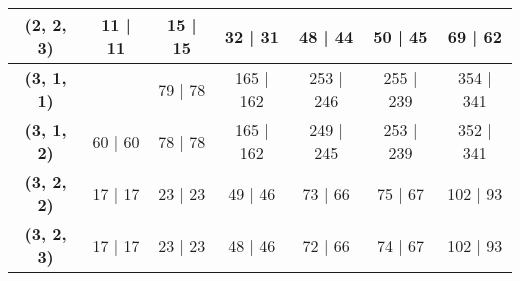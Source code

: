\documentclass[12pt]{article}
\begin{document}
\begin{table}[H]
\begin{tabular}{|c|c|c|c|c|c|c|}
  \textbf{(2, 2, 3)}            & 11 | 11                                                & \cellcolor[HTML]{F8A102}15 | 15 & 32 | 31                           & \cellcolor[HTML]{F8A102}48 | 44   & \cellcolor[HTML]{F56B00}50 | 45   & 69 | 62                           \\ \hline
  \textbf{(3, 1, 1)}            & \cellcolor[HTML]{F8A102}{\color[HTML]{333333} 61 | 60} & 79 | 78                         & \cellcolor[HTML]{F8A102}165 | 162 & 253 | 246                         & \cellcolor[HTML]{9A0000}255 | 239 & \cellcolor[HTML]{F8A102}354 | 341 \\ \hline
  \textbf{(3, 1, 2)}            & 60 | 60                                                & 78 | 78                         & \cellcolor[HTML]{F8A102}165 | 162                         & \cellcolor[HTML]{F56B00}249 | 245 & \cellcolor[HTML]{CB0000}253 | 239 & \cellcolor[HTML]{FE0000}352 | 341 \\ \hline
  \textbf{(3, 2, 2)}            & 17 | 17                                                & 23 | 23                         & 49 | 46                           & \cellcolor[HTML]{F8A102}73 | 66   & 75 | 67                           & \cellcolor[HTML]{F8A102}102 | 93  \\ \hline
  \textbf{(3, 2, 3)}            & 17 | 17                                                & 23 | 23                         & 48 | 46                           & 72 | 66                           & \cellcolor[HTML]{F8A102}74 | 67   & \cellcolor[HTML]{F8A102}102 | 93  \\ \hline
  \end{tabular}
  \end{table}
\end{document}
